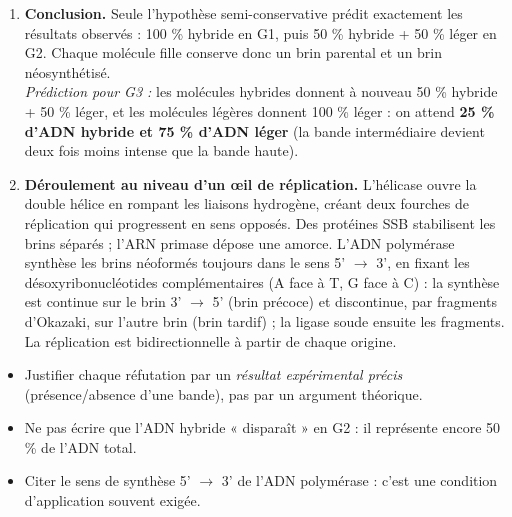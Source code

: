 \documentclass[11pt]{article}
\newcommand{\cle}[1]{{\popxbold\color{popdark}#1}}
\begin{document}
\begin{corrige}
\begin{enumerate}
\begin{itemize}
\end{itemize}
\item \textbf{Conclusion.} Seule l'hypothèse semi-conservative prédit exactement les résultats observés : 100 \% hybride en G1, puis 50 \% hybride + 50 \% léger en G2. Chaque molécule fille conserve donc un brin parental et un brin néosynthétisé.\\
\emph{Prédiction pour G3 :} les molécules hybrides donnent à nouveau 50 \% hybride + 50 \% léger, et les molécules légères donnent 100 \% léger : on attend \textbf{25 \% d'ADN hybride et 75 \% d'ADN léger} (la bande intermédiaire devient deux fois moins intense que la bande haute).
\item \textbf{Déroulement au niveau d'un œil de réplication.} L'\cle{hélicase} ouvre la double hélice en rompant les liaisons hydrogène, créant deux fourches de réplication qui progressent en sens opposés. Des protéines SSB stabilisent les brins séparés ; l'ARN primase dépose une amorce. L'\cle{ADN polymérase} synthèse les brins néoformés toujours dans le sens 5' $\rightarrow$ 3', en fixant les désoxyribonucléotides complémentaires (A face à T, G face à C) : la synthèse est continue sur le brin 3' $\rightarrow$ 5' (brin précoce) et discontinue, par fragments d'Okazaki, sur l'autre brin (brin tardif) ; la ligase soude ensuite les fragments. La réplication est bidirectionnelle à partir de chaque origine.
\end{enumerate}
\begin{attention}
\begin{itemize}
\item Justifier chaque réfutation par un \emph{résultat expérimental précis} (présence/absence d'une bande), pas par un argument théorique.
\item Ne pas écrire que l'ADN hybride « disparaît » en G2 : il représente encore 50 \% de l'ADN total.
\item Citer le sens de synthèse 5' $\rightarrow$ 3' de l'ADN polymérase : c'est une condition d'application souvent exigée.
\end{itemize}
\end{attention}
\end{corrige}
\end{document}
